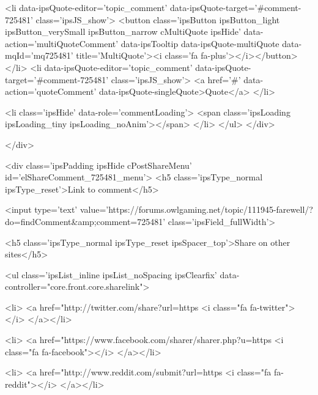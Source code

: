 						
							<li data-ipsQuote-editor='topic_comment' data-ipsQuote-target='#comment-725481' class='ipsJS_show'>
								<button class='ipsButton ipsButton_light ipsButton_verySmall ipsButton_narrow cMultiQuote ipsHide' data-action='multiQuoteComment' data-ipsTooltip data-ipsQuote-multiQuote data-mqId='mq725481' title='MultiQuote'><i class='fa fa-plus'></i></button>
							</li>
							<li data-ipsQuote-editor='topic_comment' data-ipsQuote-target='#comment-725481' class='ipsJS_show'>
								<a href='#' data-action='quoteComment' data-ipsQuote-singleQuote>Quote</a>
							</li>
						
						
						
					
					<li class='ipsHide' data-role='commentLoading'>
						<span class='ipsLoading ipsLoading_tiny ipsLoading_noAnim'></span>
					</li>
				</ul>
			</div>
		

		
	</div>

	

	



<div class='ipsPadding ipsHide cPostShareMenu' id='elShareComment_725481_menu'>
	<h5 class='ipsType_normal ipsType_reset'>Link to comment</h5>
	
		
	
	
	<input type='text' value='https://forums.owlgaming.net/topic/111945-farewell/?do=findComment&amp;comment=725481' class='ipsField_fullWidth'>

	
	<h5 class='ipsType_normal ipsType_reset ipsSpacer_top'>Share on other sites</h5>
	

	<ul class='ipsList_inline ipsList_noSpacing ipsClearfix' data-controller="core.front.core.sharelink">
		
			<li>
<a href="http://twitter.com/share?url=https%
	<i class="fa fa-twitter"></i>
</a></li>
		
			<li>
<a href="https://www.facebook.com/sharer/sharer.php?u=https%
	<i class="fa fa-facebook"></i>
</a></li>
		
			<li>
<a href="http://www.reddit.com/submit?url=https%
	<i class="fa fa-reddit"></i>
</a></li>
		

